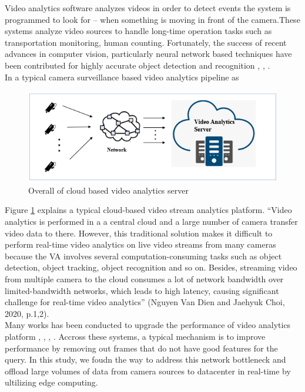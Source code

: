 Video analytics software analyzes videos in order to detect events the system is programmed to look for – when something is moving in front of the camera.These systems analyze video sources to handle long-time operation tasks such as transportation monitoring, human counting. Fortunately, the success of recent advances in computer vision, particularly neural network based techniques have been contributed for highly accurate object detection and recognition \cite{cai2015learning}, \cite{krizhevsky2017imagenet}, \cite{li2015convolutional}.\\
In a typical camera surveillance based video analytics pipeline as 
\begin{figure}
\centering
 \includegraphics[width=1.0\linewidth]{Figures/cloud.png}
 \caption{Overall of cloud based video analytics server}
 \label{fig:overall}
\end{figure}
Figure \ref{fig:overall} explains a typical cloud-based video stream analytics platform. “Video analytics is performed in a a central cloud and a large number of camera transfer video data to there. However, this traditional solution makes it difficult to perform real-time video analytics on live video streams from many cameras because the VA involves several computation-consuming tasks such as object detection, object tracking, object recognition and so on. Besides, streaming video from multiple camera to the cloud consumes a lot of network bandwidth over limited-bandwidth networks, which leads to high latency, causing significant challenge for real-time video analytics” (Nguyen Van Dien and Jaehyuk Choi, 2020, p.1,2).\\
Many works has been conducted to upgrade the performance of video analytics platform \cite{canel2019scaling}, \cite{chen2015glimpse}, \cite{hsieh2018focus}, \cite{jiang2018chameleon}. Accross these systems, a typical mechanism is to improve performance by removing out frames that do not have good features for the query. In this study, we foudn the way to address this network bottleneck and offload large volumes of data from camera sources to datacenter in real-time by ultilizing edge computing.
